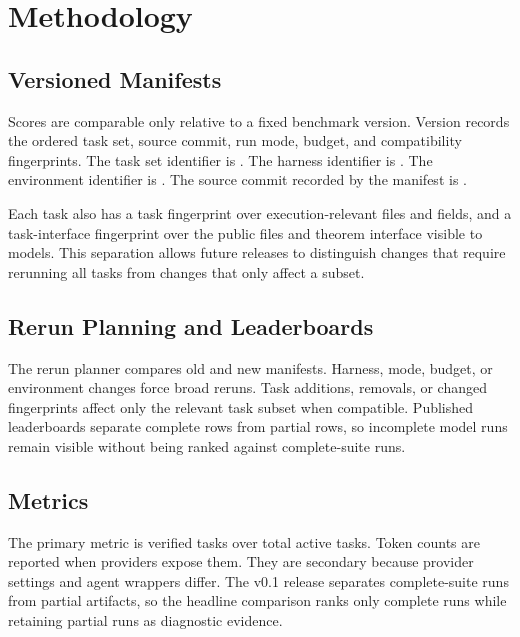 \documentclass[conference]{IEEEtran}
\begin{document}


\section{Methodology}

\subsection{Versioned Manifests}

Scores are comparable only relative to a fixed benchmark version. Version
\BenchmarkVersion{} records the ordered task set, source commit, run mode,
budget, and compatibility fingerprints. The task set identifier is
\BenchmarkTaskSetId{}. The harness identifier is \BenchmarkHarnessId{}. The
environment identifier is \BenchmarkEnvironmentId{}. The source commit recorded
by the manifest is \BenchmarkGitSha{}.

Each task also has a task fingerprint over execution-relevant files and fields,
and a task-interface fingerprint over the public files and theorem interface
visible to models. This separation allows future releases to distinguish
changes that require rerunning all tasks from changes that only affect a subset.

\subsection{Rerun Planning and Leaderboards}

The rerun planner compares old and new manifests. Harness, mode, budget, or
environment changes force broad reruns. Task additions, removals, or changed
fingerprints affect only the relevant task subset when compatible. Published
leaderboards separate complete rows from partial rows, so incomplete model runs
remain visible without being ranked against complete-suite runs.

\subsection{Metrics}

The primary metric is verified tasks over total active tasks. Token counts are
reported when providers expose them. They are secondary because provider
settings and agent wrappers differ. The v0.1 release separates complete-suite
runs from partial artifacts, so the
headline comparison ranks only complete runs while retaining partial runs as
diagnostic evidence.
\end{document}
